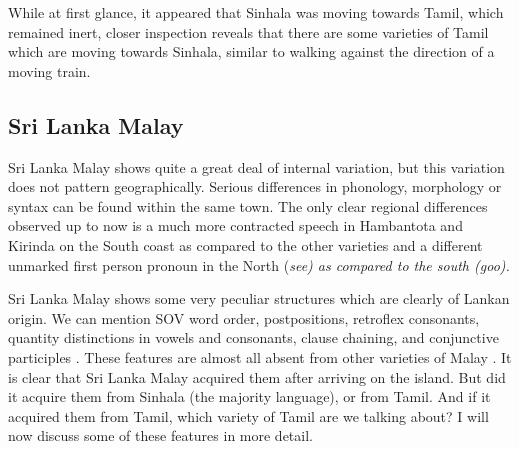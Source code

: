 \documentclass{article}
\begin{document}
% 
% 
% 


% 



While at first glance, it appeared that Sinhala was moving towards Tamil, which remained inert, closer inspection reveals that there are some varieties of Tamil which are moving towards Sinhala, similar to walking against the direction of a moving train. 
 



\subsection{Sri Lanka Malay}
Sri Lanka Malay shows quite a great deal of internal variation, but this variation does not pattern geographically. Serious differences in phonology, morphology or syntax can be found within the same town. The only clear regional differences observed up to now is a much more contracted speech in Hambantota and Kirinda on the South coast as compared to the other varieties and a different unmarked first person pronoun in the North (\em see\em) as compared to the south (\em goo\em).


Sri Lanka Malay shows some very peculiar structures which are clearly of Lankan origin. We can mention SOV word order, postpositions, retroflex consonants, quantity distinctions in vowels and consonants, clause chaining, and conjunctive participles \citep{Nordhoff2009phd,Nordhoff2012xcgrammar}. These features are almost all absent from other varieties of Malay \citep{Gil2010slm,Paauw2012xc,Nordhoff2012xcmultilayer}. It is clear that Sri Lanka Malay acquired them after arriving on the island. But did it acquire them from Sinhala (the majority language), or from Tamil. And if it acquired them from Tamil, which variety of Tamil are we talking about? I will now discuss some of these features in more detail.
\end{document}
